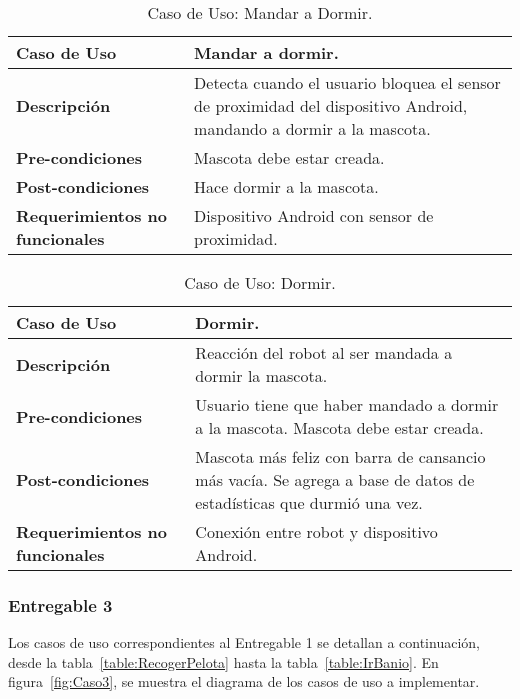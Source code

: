 \begin{table}[htbp!]
  \centering
  \begin{tabular}{|p{4cm}|p{6cm}|}\hline
    \bf{Caso de Uso}                   & Mandar a dormir. \\ \hline
    \bf{Descripci\'on}                 & Detecta cuando el usuario bloquea el sensor de proximidad del dispositivo Android, mandando a dormir a la mascota. \\ \hline
    \bf{Pre-condiciones}               & Mascota debe estar creada. \\ \hline
    \bf{Post-condiciones}              & Hace dormir a la mascota. \\ \hline
    \bf{Requerimientos no funcionales} & Dispositivo Android con sensor de proximidad. \\ \hline
  \end{tabular}
  \caption[~~Caso de Uso: Mandar a Dormir]{Caso de Uso: Mandar a Dormir.}
  \label{table:MandarDormir}
\end{table}

\begin{table}[htbp!]
  \centering
  \begin{tabular}{|p{4cm}|p{6cm}|}\hline
    \bf{Caso de Uso}                   & Dormir. \\ \hline
    \bf{Descripci\'on}                 & Reacci\'on del robot al ser mandada a dormir la mascota. \\ \hline
    \bf{Pre-condiciones}               & Usuario tiene que haber mandado a dormir a la mascota. Mascota debe estar creada. \\ \hline
    \bf{Post-condiciones}              & Mascota m\'as feliz con barra de cansancio m\'as vac\'ia. Se agrega a base de datos de estad\'isticas que durmi\'o una vez. \\ \hline
    \bf{Requerimientos no funcionales} & Conexi\'on entre robot y dispositivo Android. \\ \hline
  \end{tabular}
  \caption[~~Caso de Uso: Dormir]{Caso de Uso: Dormir.}
  \label{table:Dormir}
\end{table}

% 
%
\newpage
\subsubsection{Entregable 3}

Los casos de uso correspondientes al Entregable 1 se detallan a continuaci\'on, desde la tabla~\ref{table:RecogerPelota} hasta la tabla~\ref{table:IrBanio}. En figura~\ref{fig:Caso3}, se muestra el diagrama de los casos de uso a implementar.


